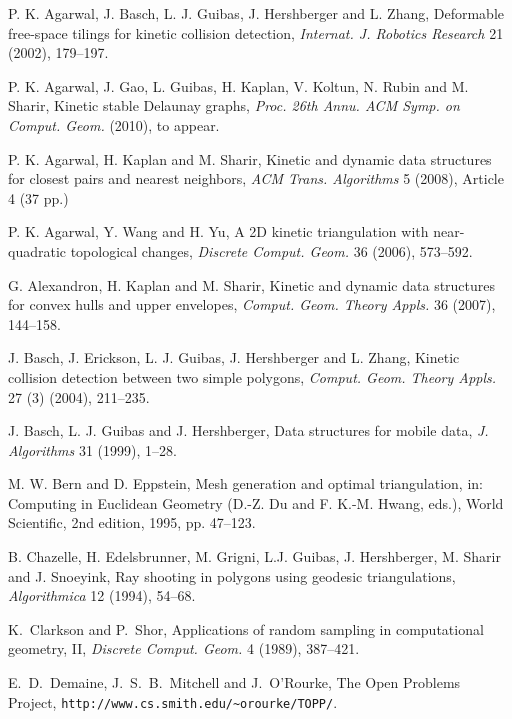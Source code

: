\documentclass[11pt]{article}
\begin{document}
\begin{thebibliography}{}

 P. K. Agarwal, J. Basch, L. J. Guibas, J. Hershberger and L. Zhang,
Deformable free-space tilings for kinetic collision detection,
{\it Internat. J. Robotics Research} 21 (2002), 179--197.

P. K. Agarwal, J. Gao, L. Guibas, H. Kaplan, V. Koltun, N. Rubin and M. Sharir,
Kinetic stable Delaunay graphs, \textit{Proc. 26th Annu. ACM Symp. on Comput. Geom.} (2010), to appear.

P. K. Agarwal, H. Kaplan and M. Sharir,
Kinetic and dynamic data structures for closest pairs and nearest neighbors,
{\it ACM Trans. Algorithms} 5 (2008), Article 4 (37 pp.)

P. K. Agarwal, Y. Wang and H. Yu,
A 2D kinetic triangulation with near-quadratic topological changes,
\textit{Discrete Comput. Geom.} 36 (2006), 573--592.

G. Alexandron, H. Kaplan and M. Sharir,
Kinetic and dynamic data structures for convex hulls and upper
envelopes,
{\it Comput. Geom. Theory Appls.} 36 (2007), 144--158.

J. Basch, J. Erickson, L. J. Guibas, J. Hershberger and L. Zhang, Kinetic collision detection between two simple polygons, {\it Comput. Geom. Theory Appls.} 27 (3) (2004), 211--235.

J. Basch, L. J. Guibas and J. Hershberger,
Data structures for mobile data,
{\it J. Algorithms} 31 (1999), 1--28.

 M. W. Bern and D. Eppstein, Mesh generation and optimal triangulation, in: Computing in Euclidean
Geometry (D.-Z. Du and F. K.-M. Hwang, eds.), World
Scientific, 2nd edition, 1995, pp. 47--123.

 B. Chazelle, H. Edelsbrunner, M. Grigni, L.J. Guibas, J. Hershberger, M. Sharir and J. Snoeyink, Ray shooting in polygons using geodesic triangulations, {\it Algorithmica} 12 (1994), 54--68.





K.~Clarkson and P.~Shor, Applications of random sampling in
computational geometry, II, \emph{Discrete Comput. Geom.} 4 (1989),
387--421.


E.~D.~Demaine, J.~S.~B.~Mitchell and J.~O'Rourke,
The Open Problems Project,
\texttt{http://www.cs.smith.edu/\~{ }orourke/TOPP/}.



\end{thebibliography}
\end{document}
